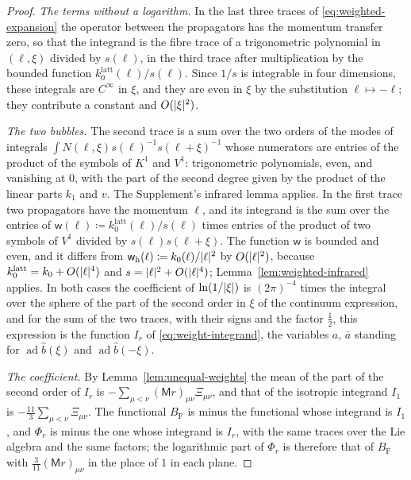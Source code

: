\documentclass[11pt]{preprint}
\DeclarePairedDelimiter{\abs}{\lvert}{\rvert}
\numberwithin{equation}{section}
\theoremstyle{definition}
\theoremstyle{remark}
\theoremstyle{plain}
\begin{document}
\begin{proof}
\emph{The terms without a logarithm.} In the last three traces of \eqref{eq:weighted-expansion} the operator between the propagators has the momentum transfer zero, so that the integrand is the fibre trace of a trigonometric polynomial in $(\ell, \xi)$ divided by $s(\ell)$, in the third trace after multiplication by the bounded function $k^{\mathrm{latt}}_0(\ell)/s(\ell)$. Since $1/s$ is integrable in four dimensions, these integrals are $C^\infty$ in $\xi$, and they are even in $\xi$ by the substitution $\ell \mapsto -\ell$; they contribute a constant and $O(\abs\xi^2)$.

\emph{The two bubbles.} The second trace is a sum over the two orders of the modes of integrals $\int N(\ell, \xi)s(\ell)^{-1}s(\ell + \xi)^{-1}$ whose numerators are entries of the product of the symbols of $K^1$ and $V^1$: trigonometric polynomials, even, and vanishing at $0$, with the part of the second degree given by the product of the linear parts $k_1$ and $v$. The Supplement's infrared lemma applies. In the first trace two propagators have the momentum $\ell$, and its integrand is the sum over the entries of $\mathsf w(\ell) \coloneqq k^{\mathrm{latt}}_0(\ell)/s(\ell)$ times entries of the product of two symbols of $V^1$ divided by $s(\ell)s(\ell + \xi)$. The function $\mathsf w$ is bounded and even, and it differs from $\mathsf w_{\mathrm h}(\ell) \coloneqq k_0(\ell)/\abs\ell^2$ by $O(\abs\ell^2)$, because $k^{\mathrm{latt}}_0 = k_0 + O(\abs\ell^4)$ and $s = \abs\ell^2 + O(\abs\ell^4)$; Lemma~\ref{lem:weighted-infrared} applies. In both cases the coefficient of $\ln(1/\abs\xi)$ is $(2\pi)^{-4}$ times the integral over the sphere of the part of the second order in $\xi$ of the continuum expression, and for the sum of the two traces, with their signs and the factor $\frac12$, this expression is the function $I_r$ of \eqref{eq:weight-integrand}, the variables $a$, $\bar a$ standing for $\operatorname{ad}\hat b(\xi)$ and $\operatorname{ad}\hat b(-\xi)$.

\emph{The coefficient.} By Lemma~\ref{lem:unequal-weights} the mean of the part of the second order of $I_r$ is $-\sum_{\mu<\nu}(\mathsf Mr)_{\mu\nu}\Xi_{\mu\nu}$, and that of the isotropic integrand $I_1$ is $-\frac{11}{3}\sum_{\mu<\nu}\Xi_{\mu\nu}$. The functional $B_{\mathrm F}$ is minus the functional whose integrand is $I_1$, and $\Phi_r$ is minus the one whose integrand is $I_r$, with the same traces over the Lie algebra and the same factors; the logarithmic part of $\Phi_r$ is therefore that of $B_{\mathrm F}$ with $\frac{3}{11}(\mathsf Mr)_{\mu\nu}$ in the place of $1$ in each plane.
\end{proof}
\end{document}
